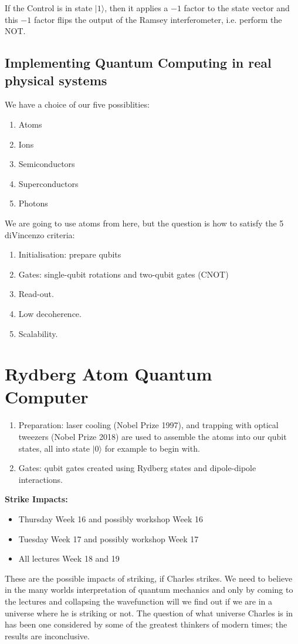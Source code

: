 \documentclass[lasers.tex]{subfiles}
\begin{document}
If the Control is in state $|1\rangle$, then it applies a $-1$ factor to the state vector and this $-1$ factor flips the output of the Ramsey interferometer, i.e. perform the NOT.

\section{Implementing Quantum Computing in real physical systems}
We have a choice of our five possiblities:
\begin{enumerate}
    \item Atoms
    \item Ions 
    \item Semiconductors
    \item Superconductors
    \item Photons
\end{enumerate}
We are going to use atoms from here, but the question is how to satisfy the 5 diVincenzo criteria:
\begin{enumerate}
    \item Initialisation: prepare qubits
    \item Gates: single-qubit rotations and two-qubit gates (CNOT)
    \item Read-out.
    \item Low decoherence.
    \item Scalability.
\end{enumerate}

\chapter{Rydberg Atom Quantum Computer}
\begin{enumerate}
    \item Preparation: laser cooling (Nobel Prize 1997), and trapping with optical tweezers (Nobel Prize 2018) are used to assemble the atoms into our qubit states, all into state $|0\rangle$ for example to begin with.
    \item Gates: qubit gates created using Rydberg states and dipole-dipole interactions.
\end{enumerate}

\textbf{Strike Impacts:}
\begin{itemize}
    \item Thursday Week 16 and possibly workshop Week 16
    \item Tuesday Week 17 and possibly workshop Week 17
    \item All lectures Week 18 and 19
\end{itemize}
These are the possible impacts of striking, if Charles strikes. 
We need to believe in the many worlds interpretation of quantum mechanics and only by coming to the lectures and collapsing the wavefunction will we find out if we are in a universe where he is striking or not.
The question of what universe Charles is in has been one considered by some of the greatest thinkers of modern times; the results are inconclusive. 
\end{document}
